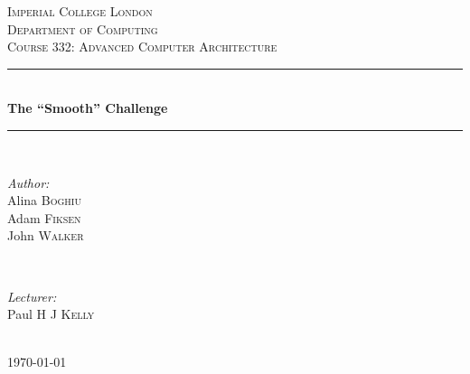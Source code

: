 \documentclass{article}
\begin{document}

\begin{titlepage}
\newcommand{\HRule}{\rule{\linewidth}{0.5mm}}
\center
\textsc{\LARGE Imperial College London}  \\[1.5cm]
\textsc{\Large Department of Computing}  \\[0.5cm]
\textsc{\large Course 332: Advanced Computer Architecture} \\[0.5cm]

\HRule \\[0.6cm]
{\huge \bfseries The ``Smooth'' Challenge} \\[0.3cm]
\HRule \\[1.5cm]

\begin{minipage}{0.4\textwidth}

\begin{flushleft} \large \emph{Author:} \\
Alina  \textsc{Boghiu} \\
Adam  \textsc{Fiksen} \\
John  \textsc{Walker} 
\end{flushleft}

\end{minipage}~
\begin{minipage}{0.4\textwidth}

\begin{flushright} \large \emph{Lecturer:} \\
Paul H J \textsc{Kelly}
\end{flushright}

\end{minipage}\\[4cm]

{\large \today}\\[3cm]
\vfill
\end{titlepage}

\end{document}
